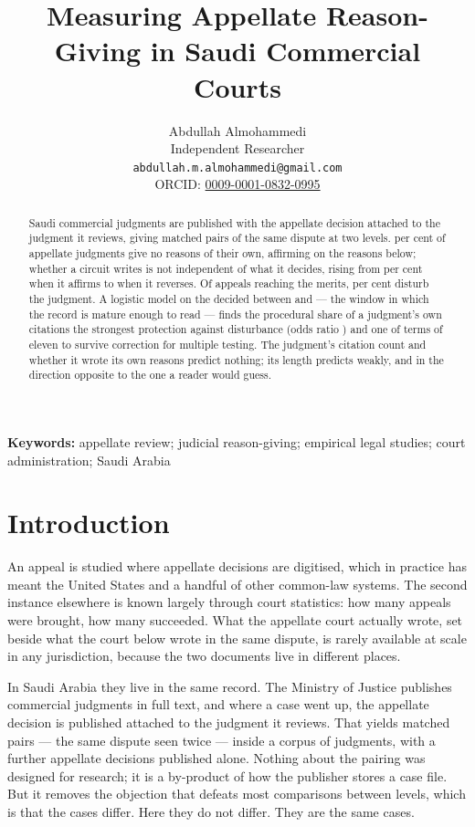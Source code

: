 \documentclass[11pt]{article}
\title{Measuring Appellate Reason-Giving in Saudi Commercial Courts}
\author{}
\date{}
\author{Abdullah Almohammedi \\
    Independent Researcher \\
    \texttt{abdullah.m.almohammedi@gmail.com} \\
    ORCID: \href{https://orcid.org/0009-0001-0832-0995}{0009-0001-0832-0995}}
\date{}
\begin{document}
\onehalfspacing        %
\maketitle

\begin{abstract}
\noindent
Saudi commercial judgments are published with the appellate decision attached
to the judgment it reviews, giving \nPaired{} matched pairs of the same
dispute at two levels. \nNoReasonsShare{} per cent of appellate judgments give
no reasons of their own, affirming on the reasons below; whether a circuit
writes is not independent of what it decides, rising from
\nWroteAffirming{} per cent when it affirms to \nWroteReversing{} when it
reverses. Of appeals reaching the merits, \nDisturbedShare{} per cent disturb
the judgment. A logistic model on the \nModelN{} decided between
\nWindowFrom{} and \nWindowTo{} --- the window in which the record is mature
enough to read --- finds the procedural
share of a judgment's own citations the strongest protection against
disturbance (odds ratio \nOrProcedural{}) and one of \nHolmSurvivors{} terms
of eleven to survive correction for multiple testing. The judgment's citation
count and whether it wrote its own reasons predict nothing; its length
predicts weakly, and in the direction opposite to the one a reader would
guess.
\end{abstract}

\noindent\textbf{Keywords:} appellate review; judicial reason-giving; empirical
legal studies; court administration; Saudi Arabia

\section{Introduction}

An appeal is studied where appellate decisions are digitised, which in
practice has meant the United States and a handful of other common-law
systems. The second instance elsewhere is known largely through court
statistics: how many appeals were brought, how many succeeded. What the
appellate court actually wrote, set beside what the court below wrote in the
same dispute, is rarely available at scale in any jurisdiction, because the
two documents live in different places.

In Saudi Arabia they live in the same record. The Ministry of Justice
publishes commercial judgments in full text, and where a case went up, the
appellate decision is published attached to the judgment it reviews. That
yields \nPaired{} matched pairs --- the same dispute seen twice --- inside a
corpus of \nJudgments{} judgments, with a further \nAppealOnly{} appellate
decisions published alone. Nothing about the pairing was designed for
research; it is a by-product of how the publisher stores a case file. But it
removes the objection that defeats most comparisons between levels, which is
that the cases differ. Here they do not differ. They are the same cases.
\end{document}
